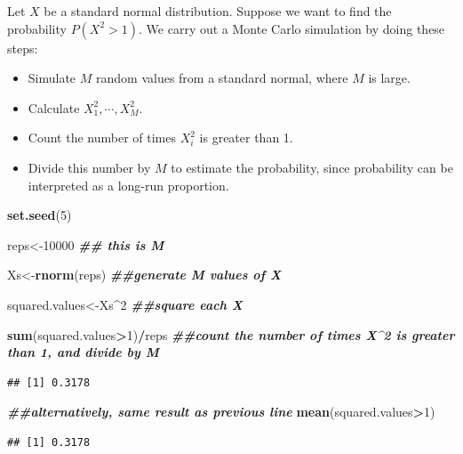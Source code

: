 \documentclass[
]{book}
\newenvironment{Shaded}{\begin{snugshade}}{\end{snugshade}}
\newcommand{\DecValTok}[1]{\textcolor[rgb]{0.00,0.00,0.81}{#1}}
\newcommand{\DocumentationTok}[1]{\textcolor[rgb]{0.56,0.35,0.01}{\textbf{\textit{#1}}}}
\newcommand{\FunctionTok}[1]{\textcolor[rgb]{0.13,0.29,0.53}{\textbf{#1}}}
\newcommand{\NormalTok}[1]{#1}
\newcommand{\OtherTok}[1]{\textcolor[rgb]{0.56,0.35,0.01}{#1}}
\newcommand{\SpecialCharTok}[1]{\textcolor[rgb]{0.81,0.36,0.00}{\textbf{#1}}}
\providecommand{\tightlist}{%
  \setlength{\itemsep}{0pt}\setlength{\parskip}{0pt}}
\theoremstyle{definition}
\theoremstyle{definition}
\theoremstyle{definition}
\theoremstyle{definition}
\theoremstyle{remark}
\begin{document}
Let \(X\) be a standard normal distribution. Suppose we want to find the probability \(P(X^2 > 1)\). We carry out a Monte Carlo simulation by doing these steps:

\begin{itemize}
\tightlist
\item
  Simulate \(M\) random values from a standard normal, where \(M\) is large.
\item
  Calculate \(X_1^2, \cdots, X_M^2\).
\item
  Count the number of times \(X_i^2\) is greater than 1.
\item
  Divide this number by \(M\) to estimate the probability, since probability can be interpreted as a long-run proportion.
\end{itemize}

\begin{Shaded}
\begin{Highlighting}[]
\FunctionTok{set.seed}\NormalTok{(}\DecValTok{5}\NormalTok{)}

\NormalTok{reps}\OtherTok{\textless{}{-}}\DecValTok{10000} \DocumentationTok{\#\# this is M}

\NormalTok{Xs}\OtherTok{\textless{}{-}}\FunctionTok{rnorm}\NormalTok{(reps) }\DocumentationTok{\#\#generate M values of X}

\NormalTok{squared.values}\OtherTok{\textless{}{-}}\NormalTok{Xs}\SpecialCharTok{\^{}}\DecValTok{2} \DocumentationTok{\#\#square each X}

\FunctionTok{sum}\NormalTok{(squared.values}\SpecialCharTok{\textgreater{}}\DecValTok{1}\NormalTok{)}\SpecialCharTok{/}\NormalTok{reps }\DocumentationTok{\#\#count the number of times X\^{}2 is greater than 1, and divide by M}
\end{Highlighting}
\end{Shaded}

\begin{verbatim}
## [1] 0.3178
\end{verbatim}

\begin{Shaded}
\begin{Highlighting}[]
\DocumentationTok{\#\#alternatively, same result as previous line}
\FunctionTok{mean}\NormalTok{(squared.values}\SpecialCharTok{\textgreater{}}\DecValTok{1}\NormalTok{)}
\end{Highlighting}
\end{Shaded}

\begin{verbatim}
## [1] 0.3178
\end{verbatim}
\end{document}
